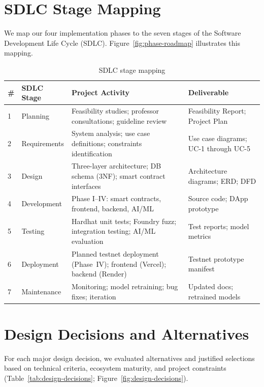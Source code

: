 \documentclass[12pt, a4paper]{report}
\newcommand{\tableheadcolor}{\rowcolor{TableHeadBg}}
\begin{document}
\section{SDLC Stage Mapping}

We map our four implementation phases to the seven stages of the Software Development Life Cycle (SDLC). Figure~\ref{fig:phase-roadmap} illustrates this mapping.

\begin{table}[H]
\centering
\caption[SDLC stage mapping]{SDLC stage mapping}
\label{tab:sdlc-mapping}
\begin{tabular}{p{0.5cm}p{2.5cm}p{4.5cm}p{5cm}}
\toprule
\tableheadcolor
\textbf{\#} & \textbf{SDLC Stage} & \textbf{Project Activity} & \textbf{Deliverable} \\
\midrule
1 & Planning & Feasibility studies; professor consultations; guideline review & Feasibility Report; Project Plan \\
2 & Requirements & System analysis; use case definitions; constraints identification & Use case diagrams; UC-1 through UC-5 \\
3 & Design & Three-layer architecture; DB schema (3NF); smart contract interfaces & Architecture diagrams; ERD; DFD \\
4 & Development & Phase I--IV: smart contracts, frontend, backend, AI/ML & Source code; DApp prototype \\
5 & Testing & Hardhat unit tests; Foundry fuzz; integration testing; AI/ML evaluation & Test reports; model metrics \\
6 & Deployment & Planned testnet deployment (Phase~IV); frontend (Vercel); backend (Render) & Testnet prototype manifest \\
7 & Maintenance & Monitoring; model retraining; bug fixes; iteration & Updated docs; retrained models \\
\bottomrule
\end{tabular}
\end{table}

\vspace{2pt}

\section{Design Decisions and Alternatives}
\label{sec:design-decisions}

For each major design decision, we evaluated alternatives and justified selections based on technical criteria, ecosystem maturity, and project constraints (Table~\ref{tab:design-decisions}; Figure~\ref{fig:design-decisions}).
\end{document}
